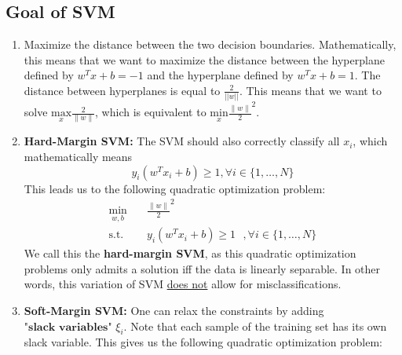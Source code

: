 \documentclass[12pt]{article}
\begin{document}
\subsection{Goal of SVM}
\begin{enumerate}
  \item Maximize the distance between the two decision boundaries. Mathematically, this means that we want to maximize the distance between the hyperplane defined by $w^{T}x + b = -1$ and the hyperplane defined by $w^{T}x + b = 1$. The distance between hyperplanes is equal to $\frac{2}{\lvert \lvert w \rvert \rvert}$. This means that we want to solve $\underset{x}{\text{max}} \frac{2}{\lVert w \rVert}$, which is equivalent to $\underset{x}{\text{min}} \frac{\lVert w \rVert}{2}^{2}$.

  \item \textbf{Hard-Margin SVM:} The SVM should also correctly classify all $x_{i}$, which mathematically means
  $$y_{i}(w^{T}x_{i}+b) \geq 1, \forall i \in \{1,\dots,N\}$$
  This leads us to the following quadratic optimization problem:
  \begin{equation}
    \begin{aligned}
    \min_{w,b} \quad & \frac{\lVert w \rVert}{2}^{2}\\
    \textrm{s.t.} \quad & y_{i}(w^{T}x_{i}+b) \geq 1 \text{  },\forall i \in \{1,\dots,N\}
    \end{aligned}
    \end{equation}
We call this the \textbf{hard-margin SVM}, as this quadratic optimization problems only admits a solution iff the data is linearly separable. In other words, this variation of SVM \underline{does not} allow for misclassifications.

  \item \textbf{Soft-Margin SVM:} One can relax the constraints by adding $\textbf{"slack variables"}$ $\xi_{i}$. Note that each sample of the training set has its own slack variable. This gives us the following quadratic optimization problem:


\end{enumerate}
\end{document}
